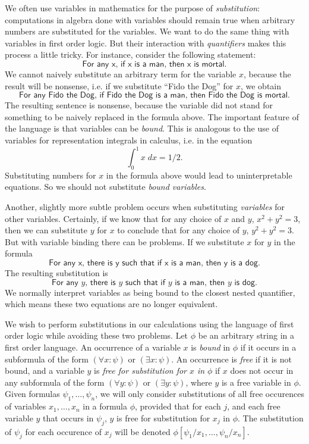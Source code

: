 We often use variables in mathematics for the purpose of \emph{substitution}: computations in algebra done with variables should remain true when arbitrary numbers are substituted for the variables. We want to do the same thing with variables in first order logic. But their interaction with \emph{quantifiers} makes this process a little tricky. For instance, consider the following statement:
%
\[ \textsf{For any x, if x is a man, then x is mortal.} \]
%
We cannot naively substitute an arbitrary term for the variable $x$, because the result will be nonsense, i.e. if we substitute ``Fido the Dog'' for $x$, we obtain
%
\[ \textsf{For any Fido the Dog, if Fido the Dog is a man, then Fido the Dog is mortal.} \]
%
The resulting sentence is nonsense, because the variable did not stand for something to be naively replaced in the formula above. The important feature of the language is that variables can be \emph{bound}. This is analogous to the use of variables for representation integrals in calculus, i.e. in the equation
%
\[ \int_0^1 x\; dx = 1/2. \]
%
Substituting numbers for $x$ in the formula above would lead to uninterpretable equations. So we should not substitute \emph{bound variables}.

Another, slightly more subtle problem occurs when substituting \emph{variables} for other variables. Certainly, if we know that for any choice of $x$ and $y$, $x^2 + y^2 = 3$, then we can substitute $y$ for $x$ to conclude that for any choice of $y$, $y^2 + y^2 = 3$. But with variable binding there can be problems. If we substitute $x$ for $y$ in the formula
%
\[ \textsf{For any x, there is y such that if x is a man, then y is a dog}. \]
%
The resulting substitution is
%
\[ \textsf{For any $y$, there is $y$ such that if $y$ is a man, then $y$ is dog}. \]
%
We normally interpret variables as being bound to the closest nested quantifier, which means these two equations are no longer equivalent.

We wish to perform substitutions in our calculations using the language of first order logic while avoiding these two problems. Let $\phi$ be an arbitrary string in a first order language. An occurrence of a variable $x$ is \emph{bound} in $\phi$ if it occurs in a subformula of the form $(\forall x: \psi)$ or $(\exists x: \psi)$. An occurrence is \emph{free} if it is not bound, and a variable $y$ is \emph{free for substitution for $x$ in} $\phi$ if $x$ does not occur in any subformula of the form $(\forall y: \psi)$ or $(\exists y: \psi)$, where $y$ is a free variable in $\phi$. Given formulas $\psi_1,\dots,\psi_n$, we will only consider substitutions of all free occurences of variables $x_1,\dots,x_n$ in a formula $\phi$, provided that for each $j$, and each free variable $y$ that occurs in $\psi_j$, $y$ is free for substitution for $x_j$ in $\phi$. The substitution of $\psi_j$ for each occurence of $x_j$ will be denoted $\phi[\psi_1/x_1,\dots,\psi_n/x_n]$.

